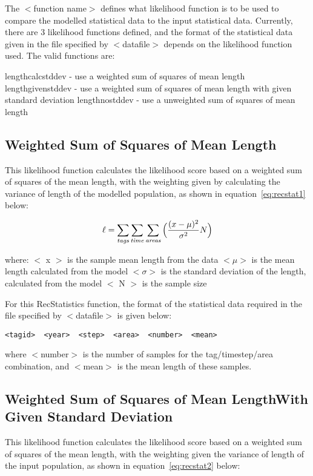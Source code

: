 \documentclass [a4paper, 10pt]{book}
\begin{document}
\bigskip
The $<$function name$>$ defines what likelihood function is to be used to compare the modelled statistical data to the input statistical data.  Currently, there are 3 likelihood functions defined, and the format of the statistical data given in the file specified by $<$datafile$>$ depends on the likelihood function used.  The valid functions are:

\bigskip
lengthcalcstddev - use a weighted sum of squares of mean length\newline
lengthgivenstddev - use a weighted sum of squares of mean length with given standard deviation\newline
lengthnostddev - use a unweighted sum of squares of mean length

\subsection{Weighted Sum of Squares of Mean Length}
This likelihood function calculates the likelihood score based on a weighted sum of squares of the mean length, with the weighting given by calculating the variance of length of the modelled population, as shown in equation~\ref{eq:recstat1} below:

\begin{equation}\label{eq:recstat1}
\ell = \sum_{\it tags}\sum_{\it time}\sum_{\it areas} \Big(\frac{(x-\mu)^2} {\sigma^2} N\Big)
\end{equation}

where:\newline
$<$ x $>$ is the sample mean length from the data\newline
$<\mu>$ is the mean length calculated from the model\newline
$<\sigma>$ is the standard deviation of the length, calculated from the model\newline
$<$ N $>$ is the sample size

\bigskip
For this RecStatistics function, the format of the statistical data required in the file specified by $<$datafile$>$ is given below:

{\small\begin{verbatim}
<tagid>  <year>  <step>  <area>  <number>  <mean>
\end{verbatim}}

where $<$number$>$ is the number of samples for the tag/timestep/area combination, and $<$mean$>$ is the mean length of these samples.

\subsection{Weighted Sum of Squares of Mean Length\newline With Given Standard Deviation}
This likelihood function calculates the likelihood score based on a weighted sum of squares of the mean length, with the weighting given the variance of length of the input population, as shown in  equation~\ref{eq:recstat2} below:
\end{document}
